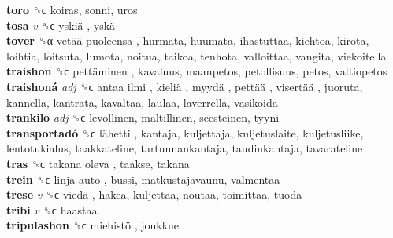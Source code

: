 \textbf{toro} ␝ϲ  koiras, sonni, uros  \\
\textbf{tosa} \emph{v}  ␝ϲ   yskiä ,  yskä   \\
\textbf{tover} ␝α   vetää puoleensa , hurmata, huumata, ihastuttaa, kiehtoa, kirota, loihtia, loitsuta, lumota, noitua, taikoa, tenhota, valloittaa, vangita, viekoitella  \\
\textbf{traishon} ␝ϲ   pettäminen , kavaluus, maanpetos, petollisuus, petos, valtiopetos  \\
\textbf{traishoná} \emph{adj}  ␝ϲ   antaa ilmi ,  kieliä ,  myydä ,  pettää ,  visertää , juoruta, kannella, kantrata, kavaltaa, laulaa, laverrella, vasikoida  \\
\textbf{trankilo} \emph{adj}  ␝ϲ  levollinen, maltillinen, seesteinen, tyyni  \\
\textbf{transportadó} ␝ϲ   lähetti , kantaja, kuljettaja, kuljetuslaite, kuljetusliike, lentotukialus, taakkateline, tartunnankantaja, taudinkantaja, tavarateline  \\
\textbf{tras} ␝ϲ   takana oleva , taakse, takana  \\
\textbf{trein} ␝ϲ   linja-auto , bussi, matkustajavaunu, valmentaa  \\
\textbf{trese} \emph{v}  ␝ϲ   viedä , hakea, kuljettaa, noutaa, toimittaa, tuoda  \\
\textbf{tribi} \emph{v}  ␝ϲ  haastaa  \\
\textbf{tripulashon} ␝ϲ   miehistö , joukkue  \\

